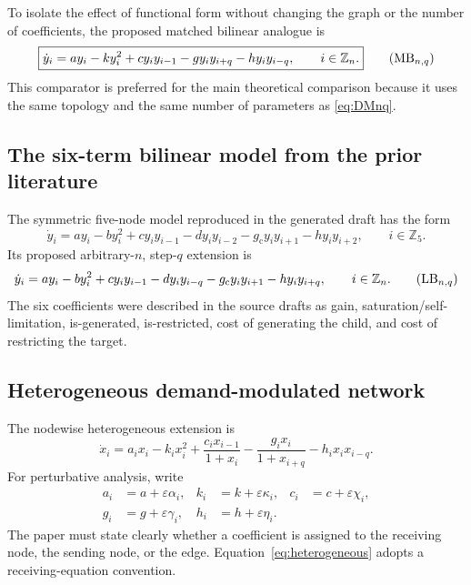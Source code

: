 \documentclass[11pt, reqno]{amsart}
\theoremstyle{definition}
\theoremstyle{remark}
\newcommand{\Z}{\mathbb{Z}}
\newcommand{\eps}{\varepsilon}
\newcommand{\MB}{\mathrm{MB}}
\newcommand{\LB}{\mathrm{LB}}
\begin{document}
	To isolate the effect of functional form without changing the graph or the
	number of coefficients, the proposed matched bilinear analogue is
	\begin{equation}
		\label{eq:MBnq}
		\boxed{
			\dot y_i
			=
			a y_i-k y_i^2
			+c y_i y_{i-1}
			-g y_i y_{i+q}
			-h y_i y_{i-q},
			\qquad i\in\Z_n.
		}
		\tag{$\MB_{n,q}$}
	\end{equation}
	This comparator is preferred for the main theoretical comparison because it
	uses the same topology and the same number of parameters as
	\eqref{eq:DMnq}.
	
	\subsection{The six-term bilinear model from the prior literature}
	
	The symmetric five-node model reproduced in the generated draft has the form
	\begin{equation}
		\label{eq:LB-five}
		\dot y_i
		=
		a y_i-b y_i^2
		+c y_i y_{i-1}
		-d y_i y_{i-2}
		-g_{\mathrm c} y_i y_{i+1}
		-h y_i y_{i+2},
		\qquad i\in\Z_5.
	\end{equation}
	Its proposed arbitrary-$n$, step-$q$ extension is
	\begin{equation}
		\label{eq:LBnq}
		\dot y_i
		=
		a y_i-b y_i^2
		+c y_i y_{i-1}
		-d y_i y_{i-q}
		-g_{\mathrm c} y_i y_{i+1}
		-h y_i y_{i+q},
		\qquad i\in\Z_n.
		\tag{$\LB_{n,q}$}
	\end{equation}
	The six coefficients were described in the source drafts as gain,
	saturation/self-limitation, is-generated, is-restricted, cost of generating the
	child, and cost of restricting the target.
	
	
	\subsection{Heterogeneous demand-modulated network}
	
	The nodewise heterogeneous extension is
	\begin{equation}
		\label{eq:heterogeneous}
		\dot x_i
		=
		a_i x_i-k_i x_i^2
		+\frac{c_i x_{i-1}}{1+x_i}
		-\frac{g_i x_i}{1+x_{i+q}}
		-h_i x_i x_{i-q}.
	\end{equation}
	For perturbative analysis, write
	\begin{equation}
		\label{eq:hetero-expansion}
		\begin{aligned}
			a_i&=a+\eps\alpha_i,
			&k_i&=k+\eps\kappa_i,
			&c_i&=c+\eps\chi_i,\\
			g_i&=g+\eps\gamma_i,
			&h_i&=h+\eps\eta_i.
		\end{aligned}
	\end{equation}
	The paper must state clearly whether a coefficient is assigned to the receiving
	node, the sending node, or the edge.  Equation~\eqref{eq:heterogeneous} adopts a
	receiving-equation convention.
	
\end{document}
